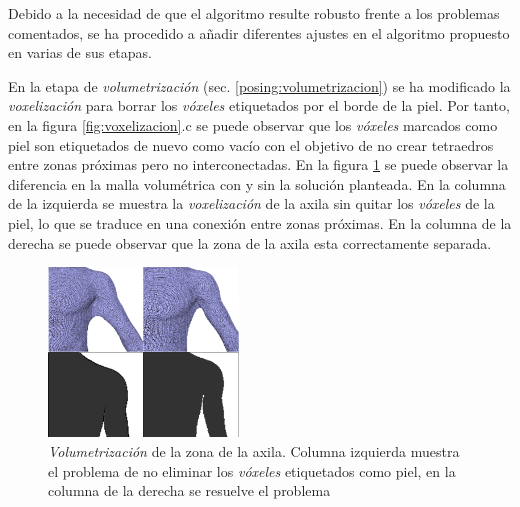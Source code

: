 Debido a la necesidad de que el algoritmo resulte robusto frente a los problemas comentados, se ha procedido a añadir diferentes ajustes en el algoritmo propuesto en varias de sus etapas.

En la etapa de \emph{volumetrización} (sec. \ref{posing:volumetrizacion}) se ha modificado la \emph{voxelización}  para borrar los \emph{vóxeles} etiquetados por el borde de la piel. Por tanto, en la figura \ref{fig:voxelizacion}.c se puede observar que los \emph{vóxeles} marcados como piel son etiquetados de nuevo como vacío con el objetivo de no crear tetraedros entre zonas próximas pero no interconectadas. En la figura \ref{fig:volsol} se puede observar la diferencia en la malla volumétrica con y sin la solución planteada. En la columna de la izquierda se muestra la \emph{voxelización} de la axila sin quitar los \emph{vóxeles} de la piel, lo que se traduce en una conexión entre zonas próximas. En la columna de la derecha se puede observar que la zona de la axila esta correctamente separada.

\begin{figure}[h]
   \centering
    \includegraphics[width=0.45\textwidth]{IMG/volumetrizacion2.png}
    \caption{
    \emph{Volumetrización} de la zona de la axila. Columna izquierda muestra el problema de no eliminar los \emph{vóxeles} etiquetados como piel, en la columna de la derecha se resuelve el problema }
\label{fig:volsol}
\end{figure}


